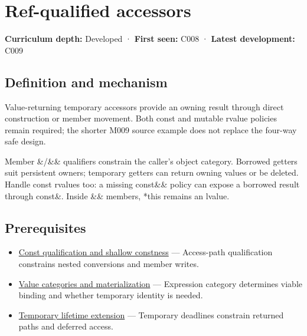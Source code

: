 \hypertarget{appendix-d42039b1d6f7}{}\label{referencestart:appendix-d42039b1d6f7}
\section{Ref-qualified accessors}\label{appendix-d42039b1d6f7-ref-qualified-accessors}

\textbf{Curriculum depth:} Developed · \textbf{First seen:} C008 · \textbf{Latest development:} C009

\begin{allmightroledefinition}

\subsection{Definition and mechanism}\label{appendix-d42039b1d6f7-definition-and-mechanism}

Value-returning temporary accessors provide an owning result through direct construction or member movement. Both const and mutable rvalue policies remain required; the shorter M009 source example does not replace the four-way safe design.

\end{allmightroledefinition}

Member \&/\&\& qualifiers constrain the caller's object category. Borrowed getters suit persistent owners; temporary getters can return owning values or be deleted. Handle const rvalues too: a missing const\&\& policy can expose a borrowed result through const\&. Inside \&\& members, *this remains an lvalue.

\subsection{Prerequisites}\label{appendix-d42039b1d6f7-prerequisites}

\begin{itemize}
\tightlist
\item
  \hyperref[appendix-c25d60fed375]{Const qualification and shallow constness} --- Access-path qualification constrains nested conversions and member writes.
\item
  \hyperref[appendix-1121b30eaeb0]{Value categories and materialization} --- Expression category determines viable binding and whether temporary identity is needed.
\item
  \hyperref[appendix-a978b29bbbb0]{Temporary lifetime extension} --- Temporary deadlines constrain returned paths and deferred access.
\end{itemize}


